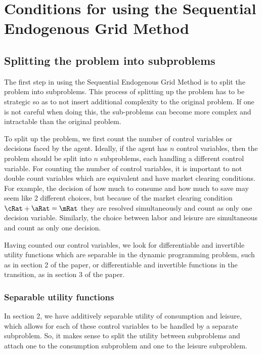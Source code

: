 \documentclass[\econtexRoot/SequentialEGM]{subfiles}
\begin{document}
\hypertarget{conditions}{}
\par\section{Conditions for using the Sequential Endogenous Grid Method}
\notinsubfile{\label{sec:conditions}}

\subsection{Splitting the problem into subproblems}

The first step in using the Sequential Endogenous Grid Method is to split the problem into subproblems. This process of splitting up the problem has to be strategic so as to not insert additional complexity to the original problem. If one is not careful when doing this, the sub-problems can become more complex and intractable than the original problem.

To split up the problem, we first count the number of control variables or decisions faced by the agent. Ideally, if the agent has $n$ control variables, then the problem should be split into $n$ subproblems, each handling a different control variable. For counting the number of control variables, it is important to not double count variables which are equivalent and have market clearing conditions. For example, the decision of how much to consume and how much to save may seem like 2 different choices, but because of the market clearing condition $\cRat + \aRat = \mRat$ they are resolved simultaneously and count as only one decision variable. Similarly, the
choice between labor and leisure are simultaneous and count as only one decision.

Having counted our control variables, we look for differentiable and invertible utility functions which are separable in the dynamic programming problem, such as in section 2 of the paper, or differentiable and invertible functions in the transition, as in section 3 of the paper.

\subsubsection{Separable utility functions}

In section 2, we have additively separable utility of consumption and leisure, which allows for each of these control variables to be handled by a separate subproblem. So, it makes sense to split the utility between subproblems and attach one to the consumption subproblem and one to the leisure subproblem.
\end{document}
